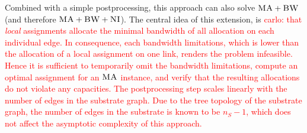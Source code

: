 \documentclass[9pt]{sigcomm-alternate}
\newcommand{\carlo}[1]{\textcolor{red}{carlo: #1}}
\newcommand{\VmChunkAssignment}{\mu}
\newcommand{\VirtualNode}{v}
\newcommand{\achunk}{\ensuremath{c}}
\newcommand{\CC}{\textsc{NI}}
\newcommand{\BW}{\textsc{BW}}
\newcommand{\MA}{\textsc{MA}}
\begin{document}

Combined with a simple postprocessing, this approach can also solve $\MA+\BW$
(and therefore $\MA+\BW+\CC$). The central idea of this extension, is 
\carlo{that \emph{local} assignments allocate the minimal bandwidth of all 
allocation on each individual edge. In consequence, each bandwidth limitations, 
which is lower than the allocation of a local assignment on one link, renders 
the problem infeasible. Hence it is sufficient to temporarily omit the 
bandwidth limitations, compute an optimal assignment for an $\MA$ instance, and 
verify that the resulting allocations do not violate any capacities. The 
postprocessing step scales linearly with the number of edges in the substrate 
graph. Due to the tree topology of the substrate graph, the number of 
edges in the substrate is known to be $n_S - 1$, which does not affect the 
asymptotic complexity of this approach.}
\end{document}
